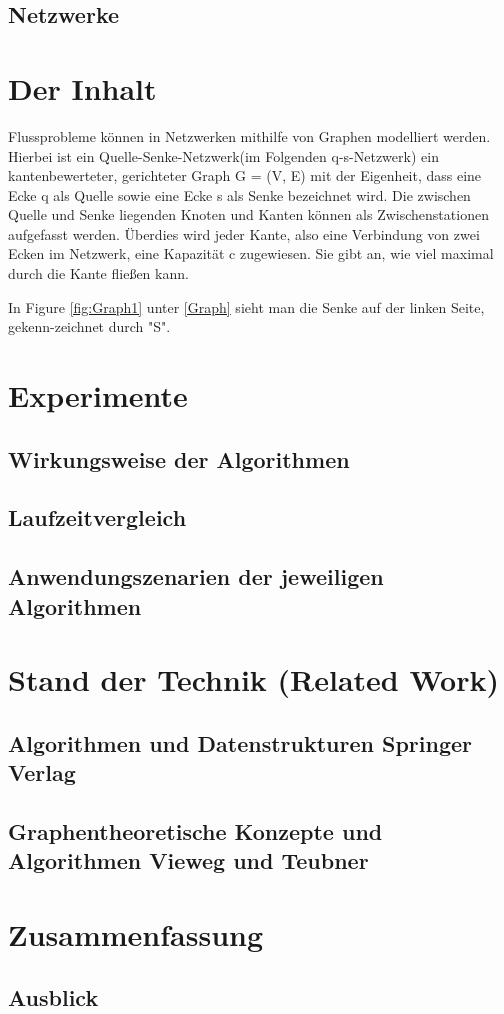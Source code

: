 \documentclass[11pt]{article}
\begin{document}
\subsection{Netzwerke}
\label{Netzwerke}

\section{Der Inhalt}
\label{Inhalt}

Flussprobleme k\"onnen in Netzwerken mithilfe von Graphen modelliert werden. Hierbei ist ein Quelle-Senke-Netzwerk(im Folgenden q-s-Netzwerk) ein kantenbewerteter, gerichteter Graph G = (V, E) mit der Eigenheit, dass eine Ecke q als Quelle sowie eine Ecke s als Senke bezeichnet wird. Die zwischen Quelle und Senke liegenden Knoten und Kanten können als Zwischenstationen aufgefasst werden. \"Uberdies wird jeder Kante, also eine Verbindung von zwei Ecken im Netzwerk, eine Kapazität c zugewiesen. Sie gibt an, wie viel maximal durch die Kante fließen kann. \citep{Testref}

In Figure \ref{fig:Graph1} unter \ref{Graph} sieht man die Senke auf der linken Seite, gekenn-zeichnet durch "S". 



\section{Experimente}
\label{Experimente}

\subsection{Wirkungsweise der Algorithmen}

\subsection{Laufzeitvergleich}

\subsection{Anwendungszenarien der jeweiligen Algorithmen}

\section{Stand der Technik (Related Work)}
\label{Related Work}
\subsection{Algorithmen und Datenstrukturen Springer Verlag}
\subsection{Graphentheoretische Konzepte und Algorithmen Vieweg und Teubner}

\section{Zusammenfassung}
\label{Zusammenfassung}
\subsection{Ausblick}




 
\end{document}
